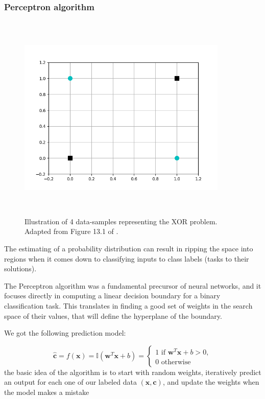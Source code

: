 \documentclass[11pt,english,listoffigures,listoftables]{tfgetsinf}
\newcommand{\vect}[1]{\mathbf{#1}}
\begin{document}
\subsubsection{Perceptron algorithm}
\begin{figure}
\centering
\includegraphics[width=10cm,keepaspectratio,height=10cm]{resources/xor.png}
\caption{Illustration of 4 data-samples representing the XOR problem. Adapted from Figure 13.1 of \cite{pml1Book}.}\label{chap1:xor}
\end{figure}

The estimating of a probability distribution can result in ripping the space into regions when it comes down to classifying inputs to class labels (tasks to their solutions).

The Perceptron algorithm \cite{rosenblatt1958perceptron} was a fundamental precursor of neural networks, and it focuses directly in computing a linear decision boundary for a binary classification task. This translates in finding a good set of weights in the search space of their values, that will define the hyperplane of the boundary. 

We got the following prediction model:

\begin{equation}\label{perc}
    \vect{\hat{c}}= f(\vect{x}) = \mathbb{I}(\vect{w}^T\vect{x} + b)=
    \begin{cases}
        1 \text{ if } \vect{w}^T\vect{x} + b > 0,\\
        0 \text{ otherwise}
    \end{cases}
\end{equation}
the basic idea of the algorithm is to start with random weights, iteratively predict an output for each one of our labeled data $(\vect{x}, \vect{c})$, and update the weights when the model makes a mistake
\end{document}
